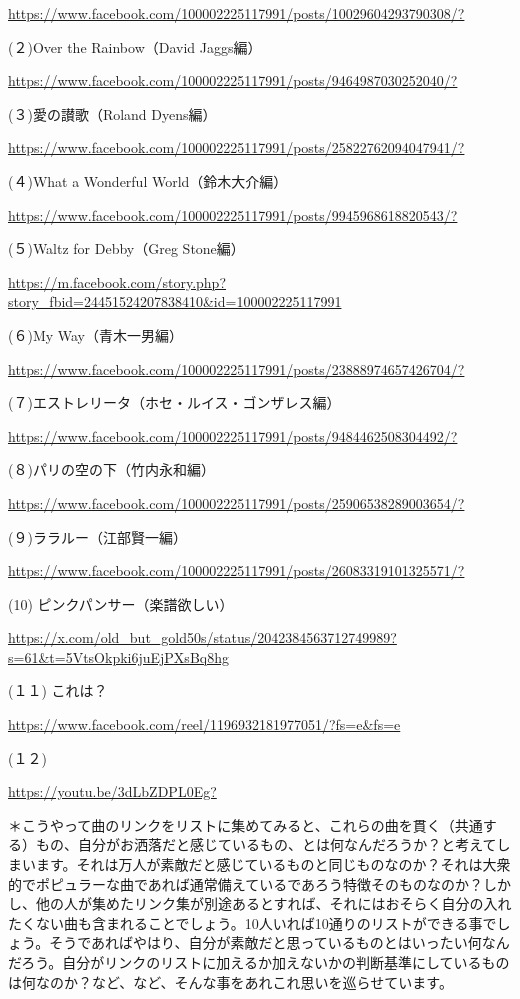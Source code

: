 \url{https://www.facebook.com/100002225117991/posts/10029604293790308/?}

(２)Over the Rainbow（David Jaggs編）

\url{https://www.facebook.com/100002225117991/posts/9464987030252040/?}

(３)愛の讃歌（Roland Dyens編）

\url{https://www.facebook.com/100002225117991/posts/25822762094047941/?}

(４)What a Wonderful World（鈴木大介編）

\url{https://www.facebook.com/100002225117991/posts/9945968618820543/?}

(５)Waltz for Debby（Greg Stone編）

\url{https://m.facebook.com/story.php?story_fbid=24451524207838410&id=100002225117991}

(６)My Way（青木一男編）

\url{https://www.facebook.com/100002225117991/posts/23888974657426704/?}

(７)エストレリータ（ホセ・ルイス・ゴンザレス編）

\url{https://www.facebook.com/100002225117991/posts/9484462508304492/?}

(８)パリの空の下（竹内永和編）

\url{https://www.facebook.com/100002225117991/posts/25906538289003654/?}

(９)ララルー（江部賢一編）

\url{https://www.facebook.com/100002225117991/posts/26083319101325571/?}

(10) ピンクパンサー（楽譜欲しい）

\url{https://x.com/old_but_gold50s/status/2042384563712749989?s=61&t=5VtsOkpki6juEjPXsBq8hg}

(１１) これは？

\url{https://www.facebook.com/reel/1196932181977051/?fs=e&fs=e}

(１２)

\url{https://youtu.be/3dLbZDPL0Eg?}

＊こうやって曲のリンクをリストに集めてみると、これらの曲を貫く（共通する）もの、自分がお洒落だと感じているもの、とは何なんだろうか？と考えてしまいます。それは万人が素敵だと感じているものと同じものなのか？それは大衆的でポピュラーな曲であれば通常備えているであろう特徴そのものなのか？しかし、他の人が集めたリンク集が別途あるとすれば、それにはおそらく自分の入れたくない曲も含まれることでしょう。10人いれば10通りのリストができる事でしょう。そうであればやはり、自分が素敵だと思っているものとはいったい何なんだろう。自分がリンクのリストに加えるか加えないかの判断基準にしているものは何なのか？など、など、そんな事をあれこれ思いを巡らせています。

